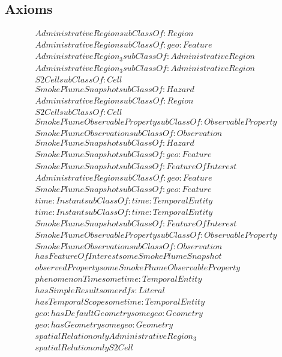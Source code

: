 \subsection{Axioms}
\begin{align}
  AdministrativeRegion subClassOf: Region\\
  AdministrativeRegion subClassOf: geo:Feature\\
  AdministrativeRegion_3 subClassOf: AdministrativeRegion\\
  AdministrativeRegion_3 subClassOf: AdministrativeRegion\\
  S2Cell subClassOf: Cell\\
  SmokePlumeSnapshot subClassOf: Hazard\\
  AdministrativeRegion subClassOf: Region\\
  S2Cell subClassOf: Cell\\
  SmokePlumeObservableProperty subClassOf: ObservableProperty\\
  SmokePlumeObservation subClassOf: Observation\\
  SmokePlumeSnapshot subClassOf: Hazard\\
  SmokePlumeSnapshot subClassOf: geo:Feature\\
  SmokePlumeSnapshot subClassOf: FeatureOfInterest\\
  AdministrativeRegion subClassOf: geo:Feature\\
  SmokePlumeSnapshot subClassOf: geo:Feature\\
  time:Instant subClassOf: time:TemporalEntity\\
  time:Instant subClassOf: time:TemporalEntity\\
  SmokePlumeSnapshot subClassOf: FeatureOfInterest\\
  SmokePlumeObservableProperty subClassOf: ObservableProperty\\
  SmokePlumeObservation subClassOf: Observation\\
  hasFeatureOfInterest some SmokePlumeSnapshot \\
  observedProperty some SmokePlumeObservableProperty \\
  phenomenonTime some time:TemporalEntity \\
  hasSimpleResult some rdfs:Literal \\
  hasTemporalScope some time:TemporalEntity \\
  geo:hasDefaultGeometry some geo:Geometry \\
  geo:hasGeometry some geo:Geometry \\
  spatialRelation only AdministrativeRegion_3 \\
  spatialRelation only S2Cell \end{align}


